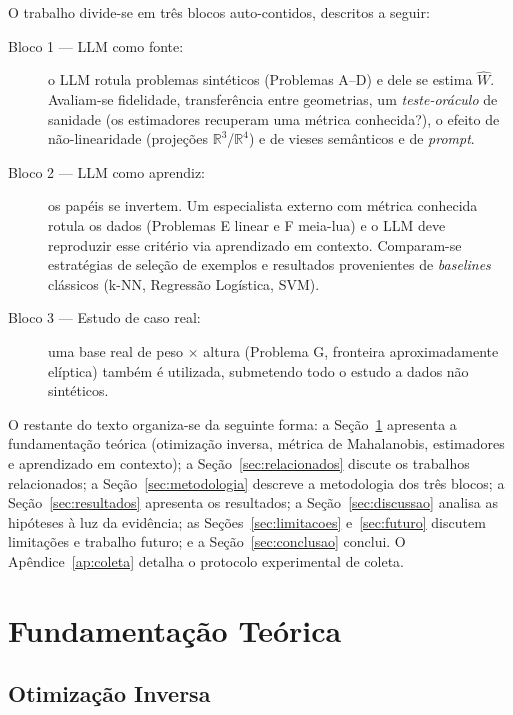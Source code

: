 \documentclass[12pt,a4paper]{article}
\newcommand{\West}{\ensuremath{\hat{W}}}   %
\begin{document}
O trabalho divide-se em três blocos auto-contidos, descritos a seguir:

\begin{description}
  \item[Bloco 1 — LLM como fonte:] o LLM rotula problemas sintéticos (Problemas A–D) e
    dele se estima \West{}. Avaliam-se fidelidade, transferência entre geometrias, um
    \emph{teste-oráculo} de sanidade (os estimadores recuperam uma métrica conhecida?),
    o efeito de não-linearidade (projeções $\mathbb{R}^3$/$\mathbb{R}^4$) e de vieses
    semânticos e de \emph{prompt}.
  \item[Bloco 2 — LLM como aprendiz:] os papéis se invertem. Um especialista externo com
    métrica conhecida rotula os dados (Problemas E linear e F meia-lua) e o LLM deve
    reproduzir esse critério via aprendizado em contexto. Comparam-se estratégias de
    seleção de exemplos e resultados provenientes de \emph{baselines} clássicos
    (k-NN, Regressão Logística, SVM).
  \item[Bloco 3 — Estudo de caso real:] uma base real de peso $\times$ altura (Problema G,
    fronteira aproximadamente elíptica) também é utilizada, submetendo todo o estudo a
    dados não sintéticos.
\end{description}

O restante do texto organiza-se da seguinte forma: a Seção~\ref{sec:fundamentos}
apresenta a fundamentação teórica (otimização inversa, métrica de Mahalanobis, estimadores
e aprendizado em contexto); a Seção~\ref{sec:relacionados} discute os trabalhos
relacionados; a Seção~\ref{sec:metodologia} descreve a metodologia dos três blocos; a
Seção~\ref{sec:resultados} apresenta os resultados; a Seção~\ref{sec:discussao} analisa as
hipóteses à luz da evidência; as Seções~\ref{sec:limitacoes} e~\ref{sec:futuro} discutem
limitações e trabalho futuro; e a Seção~\ref{sec:conclusao} conclui. O
Apêndice~\ref{ap:coleta} detalha o protocolo experimental de coleta.

\section{Fundamentação Teórica}
\label{sec:fundamentos}

\subsection{Otimização Inversa}
\end{document}
